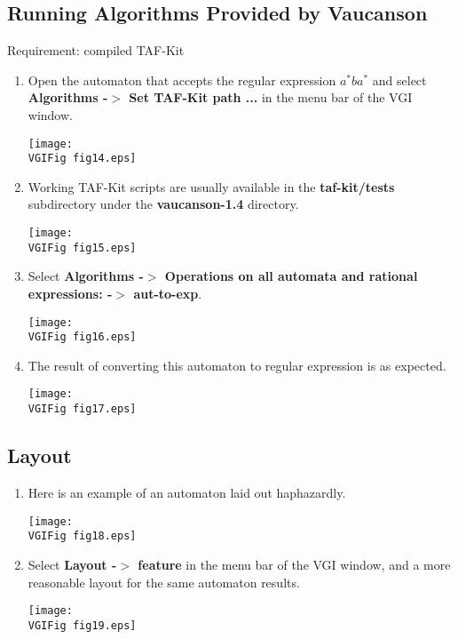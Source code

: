 \subsection{Running Algorithms Provided by Vaucanson}
% 

\noindent
 Requirement:  compiled TAF-Kit
\begin{enumerate}
\item  Open the automaton that accepts the regular expression
$a^*ba^*$ and select {\bf Algorithms -$>$ Set TAF-Kit path ...} in
the menu bar of the VGI window.
\begin{center}
\texttt{[image: \\VGIFig fig14.eps]}
\end{center}

\item  Working TAF-Kit scripts are usually available in the {\bf
taf-kit/tests}
subdirectory under the {\bf vaucanson-1.4} directory.
\begin{center}
\texttt{[image: \\VGIFig fig15.eps]}
\end{center}

\item   Select {\bf Algorithms -$>$ Operations on all automata and rational
expressions: -$>$ aut-to-exp}.
\begin{center}
\texttt{[image: \\VGIFig fig16.eps]}
\end{center}

\item The result of converting this automaton to regular expression is as expected.
\begin{center}
\texttt{[image: \\VGIFig fig17.eps]}
\end{center}
\end{enumerate}


\subsection{Layout}

\begin{enumerate}
\item  Here is an example of an automaton laid out haphazardly.
\begin{center}
\texttt{[image: \\VGIFig fig18.eps]}
\end{center}

\item    Select {\bf  Layout -$>$ feature}
in the menu bar of the VGI window, and a more reasonable layout for the same automaton results.
\begin{center}
\texttt{[image: \\VGIFig fig19.eps]}
\end{center}

\end{enumerate}

\endinput